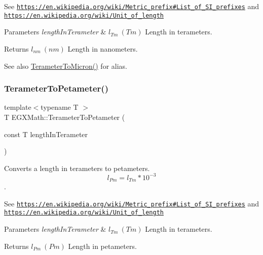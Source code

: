 See \href{https://en.wikipedia.org/wiki/Metric_prefix#List_of_SI_prefixes}{\tt https\+://en.\+wikipedia.\+org/wiki/\+Metric\+\_\+prefix\#\+List\+\_\+of\+\_\+\+S\+I\+\_\+prefixes} and \href{https://en.wikipedia.org/wiki/Unit_of_length}{\tt https\+://en.\+wikipedia.\+org/wiki/\+Unit\+\_\+of\+\_\+length} 
\begin{DoxyParams}{Parameters}
{\em length\+In\+Terameter} & $ l_{Tm}\ (Tm)$ Length in terameters. \\
\hline
\end{DoxyParams}
\begin{DoxyReturn}{Returns}
$ l_{nm}\ (nm)$ Length in nanometers. 
\end{DoxyReturn}
\begin{DoxySeeAlso}{See also}
\mbox{\hyperlink{group___e_g_x_math-_conversions-_length_conversions-_terameter-_non-_s_i_gaa5fdc4aaf15e6428cf443e3d808403a3}{Terameter\+To\+Micron()}} for alias. 
\end{DoxySeeAlso}
\mbox{\label{group___e_g_x_math-_conversions-_length_conversions-_terameter-_s_i_ga0e5474db8b07f9fd87fa6539a02af527}} 
\subsubsection{\texorpdfstring{Terameter\+To\+Petameter()}{TerameterToPetameter()}}
{\footnotesize\ttfamily template$<$typename T $>$ \\
T E\+G\+X\+Math\+::\+Terameter\+To\+Petameter (\begin{DoxyParamCaption}\item[{const T}]{length\+In\+Terameter }\end{DoxyParamCaption})}



Converts a length in terameters to petameters. \[ l_{Pm}=l_{Tm} * 10^{-3} \]. 

See \href{https://en.wikipedia.org/wiki/Metric_prefix#List_of_SI_prefixes}{\tt https\+://en.\+wikipedia.\+org/wiki/\+Metric\+\_\+prefix\#\+List\+\_\+of\+\_\+\+S\+I\+\_\+prefixes} and \href{https://en.wikipedia.org/wiki/Unit_of_length}{\tt https\+://en.\+wikipedia.\+org/wiki/\+Unit\+\_\+of\+\_\+length} 
\begin{DoxyParams}{Parameters}
{\em length\+In\+Terameter} & $ l_{Tm}\ (Tm)$ Length in terameters. \\
\hline
\end{DoxyParams}
\begin{DoxyReturn}{Returns}
$ l_{Pm}\ (Pm)$ Length in petameters. 
\end{DoxyReturn}
\mbox{\label{group___e_g_x_math-_conversions-_length_conversions-_terameter-_s_i_ga131f3ccf4db05a31f5bd5c9487da9a4e}} 
